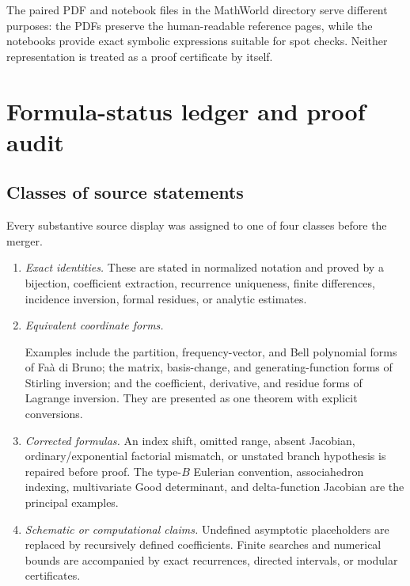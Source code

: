 \documentclass[11pt,a4paper,oneside,openany]{book}
\theoremstyle{definition}
\theoremstyle{remark}
\begin{document}
The paired PDF and notebook files in the MathWorld directory serve different
purposes: the PDFs preserve the human-readable reference pages, while the notebooks
provide exact symbolic expressions suitable for spot checks.  Neither representation
is treated as a proof certificate by itself.

\chapter{Formula-status ledger and proof audit}
\label{ch:merged-proof-audit}

\section{Classes of source statements}
Every substantive source display was assigned to one of four classes before the
merger.
\begin{enumerate}
\item \emph{Exact identities.}  These are stated in normalized notation and proved
      by a bijection, coefficient extraction, recurrence uniqueness, finite
      differences, incidence inversion, formal residues, or analytic estimates.
\item \emph{Equivalent coordinate forms.}\par
      Examples include the partition, frequency-vector, and Bell polynomial forms
      of Fa\`a di Bruno; the matrix,
      basis-change, and generating-function forms of Stirling inversion; and the
      coefficient, derivative, and residue forms of Lagrange inversion.  They are
      presented as one theorem with explicit conversions.
\item \emph{Corrected formulas.}  An index shift, omitted range, absent Jacobian,
      ordinary/exponential factorial mismatch, or unstated branch hypothesis is
      repaired before proof.  The type-$B$ Eulerian convention, associahedron
      indexing, multivariate Good determinant, and delta-function Jacobian are the
      principal examples.
\item \emph{Schematic or computational claims.}  Undefined asymptotic placeholders
      are replaced by recursively defined coefficients.  Finite searches and
      numerical bounds are accompanied by exact recurrences, directed intervals,
      or modular certificates.
\end{enumerate}
\end{document}
